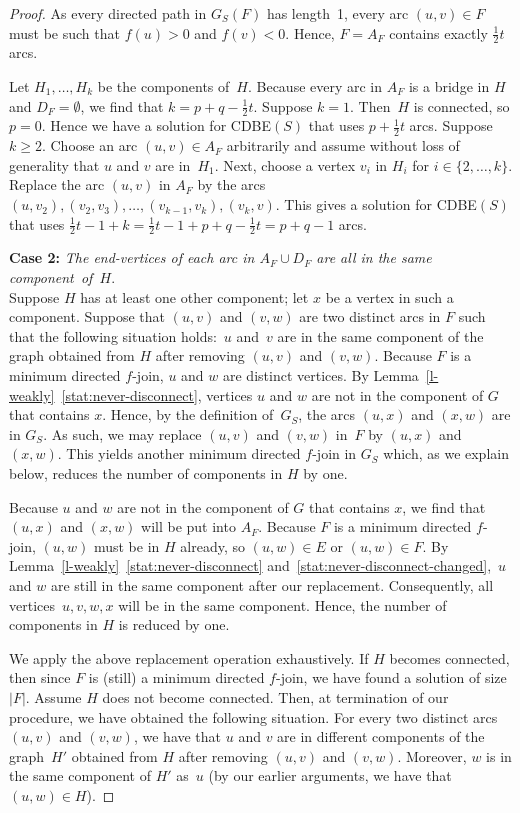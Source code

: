 \documentclass[11pt]{llncs}
\newcommand{\cdbe}{{\sc CDBE}}
\newcommand\displaycase[1]{{\bf #1}}
\begin{document}
\begin{proof}
As every directed path in $G_S(F)$ has length~1, every arc $(u,v) \in F$ must
be such that $f(u)>0$ and $f(v)<0$.  Hence, $F=A_F$ contains exactly $\frac{1}{2}t$
arcs.

Let $H_1,\ldots,H_k$ be the components of~$H$. Because every arc in $A_F$ is a
bridge in $H$ and $D_F=\emptyset$, we find that $k=p+q-\frac{1}{2}t$.  Suppose
$k=1$. Then~$H$ is connected, so $p=0$.  Hence we
have a solution for \cdbe$(S)$ that uses $p+\frac{1}{2}t$ arcs.  Suppose $k\geq 2$.
Choose an arc  $(u,v) \in A_F$ arbitrarily and assume without loss of
generality that $u$ and $v$ are in~$H_1$. Next, choose a vertex $v_i$ in $H_i$
for $i\in\{2,\ldots,k\}$.  Replace the arc $(u,v)$ in $A_F$ by the arcs
$(u,v_2),(v_2,v_3),\ldots,(v_{k-1},v_k),(v_k,v)$.  This gives a solution for
\cdbe$(S)$ that uses $\frac{1}{2}t-1+k=\frac{1}{2}t-1+p+q-\frac{1}{2}t=p+q-1$
arcs. 

\medskip
\noindent
\displaycase{Case 2:} {\em The end-vertices of each arc in $A_F\cup D_F$ are all in the same component~of~$H$}.\\  
Suppose $H$ has at least one other component; let $x$ be a vertex in such a
component.  Suppose that $(u,v)$ and $(v,w)$ are two distinct arcs in $F$ such
that the following situation holds:~$u$ and~$v$ are in the same component of
the graph obtained from $H$ after removing $(u,v)$ and $(v,w)$.  Because $F$ is
a minimum directed $f$-join, $u$ and $w$ are distinct vertices.  By
Lemma~\ref{l-weakly}~\ref{stat:never-disconnect}, vertices $u$ and $w$ are not in the component of $G$
that contains $x$.  Hence, by the definition of~$G_S$, the arcs $(u,x)$ and
$(x,w)$ are in $G_S$.  As such, we may replace $(u,v)$ and $(v,w)$ in~$F$ by
$(u,x)$ and $(x,w)$.  This yields another minimum directed $f$-join in $G_S$
which, as we explain below, reduces the number of components in $H$ by one.

Because $u$ and $w$ are not in the component of $G$ that contains $x$, we find
that $(u,x)$ and $(x,w)$ will be put into $A_F$. Because $F$ is a minimum
directed $f$-join, $(u,w)$ must be in $H$ already, so $(u,w) \in E$ or $(u,w)
\in F$. By Lemma~\ref{l-weakly}~\ref{stat:never-disconnect} and~\ref{stat:never-disconnect-changed},~$u$ and $w$ are still in the
same component after our replacement.  Consequently, all vertices~$u,v,w,x$
will be in the same  component.  Hence, the number of components in $H$ is
reduced by one.

We apply the above replacement operation exhaustively.  If $H$ becomes
connected, then since $F$ is (still) a minimum directed $f$-join, we have found
a solution of size $|F|$.  Assume $H$ does not become connected. Then, at
termination of our procedure, we have obtained the following situation.  For
every two distinct arcs $(u,v)$ and $(v,w)$, we have that $u$ and $v$ are in
different components of the graph~$H'$ obtained from $H$ after removing $(u,v)$
and $(v,w)$. Moreover, $w$ is in the same component of $H'$ as~$u$ (by our
earlier arguments, we have that $(u,w)\in H$).


\end{proof}
\end{document}
